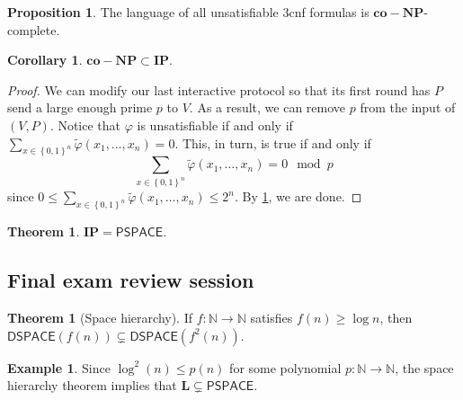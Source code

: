 \documentclass[10pt,letterpaper,cm]{nupset}
\theoremstyle{definition}
\newtheorem{exmp}[definition]{Example}
\theoremstyle{theorem}
\newtheorem{theorem}[definition]{Theorem}
\newtheorem{prop}[definition]{Proposition}
\newtheorem{corollary}[definition]{Corollary}
\theoremstyle{remark}
\newcommand{\N}{\mathbb N}
\newcommand{\1}{\mathbf{1}}
\newcommand{\0}{\vec 0}
\begin{document}
\begin{prop}\label{LP}
The language of all unsatisfiable 3cnf formulas is $\mathbf{co{-}NP}$-complete.
\end{prop}

\begin{corollary}
$\mathbf{co{-}NP} \subset \mathbf{IP}$.
\end{corollary}
\begin{proof}
We can modify our last interactive protocol so that its first round has $P$ send a large enough prime $p$ to $V$. As a result, we can remove $p$ from the input of $(V, P)$. Notice that $\varphi$ is unsatisfiable if and only if $\sum_{x\in \left\{0,1\right\}^n} \tilde{\varphi}(x_1, \ldots, x_n) =0$. This, in turn, is true if and only if  $$ \sum_{x\in \left\{0,1\right\}^n} \tilde{\varphi}(x_1, \ldots, x_n) =0 \mod p$$ since  $0\leq \sum_{x\in \left\{0,1\right\}^n} \tilde{\varphi}(x_1, \ldots, x_n) \leq 2^n$. By \cref{LP}, we are done. 
\end{proof}

\begin{theorem}
$\mathbf{IP} = \mathsf{PSPACE}$.
\end{theorem}

\subsection{Final exam review session}

\begin{theorem}[Space hierarchy]
If $f: \N \to \N$ satisfies $f(n) \geq \log{n}$, then $\mathsf{DSPACE}(f(n)) \subsetneq \mathsf{DSPACE}(f^2(n))$.
\end{theorem}

\begin{exmp}
 Since $\log^2(n) \leq p(n)$ for some polynomial $p: \N \to \N$, the space hierarchy theorem implies that $\mathbf{L} \subsetneq \mathsf{PSPACE}$.
\end{exmp}
\end{document}
